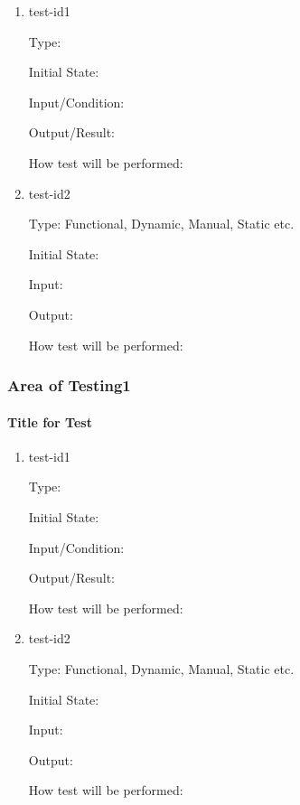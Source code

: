 \documentclass[12pt, titlepage]{article}
\begin{document}
\begin{enumerate}

\item{test-id1\\}

Type: 
					
Initial State: 
					
Input/Condition: 
					
Output/Result: 
					
How test will be performed: 
					
\item{test-id2\\}

Type: Functional, Dynamic, Manual, Static etc.
					
Initial State: 
					
Input: 
					
Output: 
					
How test will be performed: 

\end{enumerate}

\subsubsection{Area of Testing1}

\paragraph{Title for Test}

\begin{enumerate}
	
	\item{test-id1\\}
	
	Type: 
	
	Initial State: 
	
	Input/Condition: 
	
	Output/Result: 
	
	How test will be performed: 
	
	\item{test-id2\\}
	
	Type: Functional, Dynamic, Manual, Static etc.
	
	Initial State: 
	
	Input: 
	
	Output: 
	
	How test will be performed: 
	
\end{enumerate}
\end{document}
